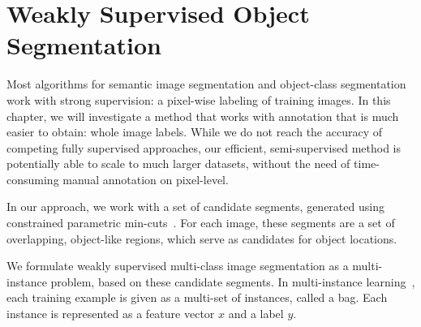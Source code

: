 \chapter{Weakly Supervised Object Segmentation}

Most algorithms for semantic image segmentation and object-class segmentation
work with strong supervision: a pixel-wise labeling of training images. In this
chapter, we will investigate a method that works with annotation that is much
easier to obtain: whole image labels.
While we do not reach the accuracy of competing fully supervised approaches,
our efficient, semi-supervised method is potentially able to scale to much
larger datasets, without the need of time-consuming manual annotation on
pixel-level.



In our approach, we work with a set of candidate segments, generated using
constrained parametric min-cuts~\citep{carreira2010constrained}.  For each
image, these segments are a set of overlapping, object-like regions, which
serve as candidates for object locations.

We formulate weakly supervised multi-class image segmentation as a
multi-instance problem, based on these candidate segments.  In multi-instance
learning~\citep{dietterich1997solving}, each training example is given as a
multi-set of instances, called a bag.  Each instance is represented as a
feature vector $x$ and a label $y$.

